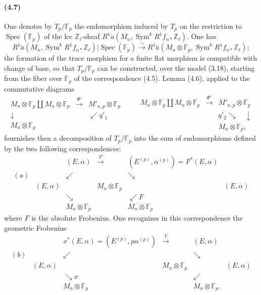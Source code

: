 \documentclass[10pt]{article}
\newcommand{\Z}{\mathbb Z}
\newcommand{\Sym}{\operatorname{Sym}}
\newcommand{\Spec}{\operatorname{Spec}}
\newcommand{\F}{\mathbb F}
\begin{document}
\paragraph{(4.7)}
One denotes by $T_p/\F_p$ the endomorphism induced by $T_p$ on the restriction to $\Spec(\F_p)$ of the lcc $\Z_\ell$-sheaf $R^1\widetilde a(M_n,\Sym^k R^1f_{n*}\Z_\ell)$. One has
\[
R^1\widetilde a(M_n,\Sym^k R^1f_{n*}\Z_\ell)|\Spec(\F_p)
\xrightarrow{\sim}
R^1\widetilde a(M_n\otimes\F_p,\Sym^k R^1f_{n*}\Z_\ell);
\]
the formation of the trace morphism for a finite flat morphism is compatible with change of base, so that $T_p/\F_p$ can be constructed, over the model (3.18), starting from the fiber over $\F_p$ of the correspondence (4.5). Lemma (4.6), applied to the commutative diagrams
\[
\begin{array}{ccc}
M_n\otimes\F_p\coprod M_n\otimes\F_p&\xrightarrow{\Phi'}&M'_{n,p}\otimes\F_p\\
\downarrow&&\swarrow q'_1\\
M_n\otimes\F_p&&
\end{array}
\qquad
\begin{array}{ccc}
M_n\otimes\F_p\coprod M_n\otimes\F_p&\xrightarrow{\Phi'}&M'_{n,p}\otimes\F_p\\
&&q'_2\searrow\quad\downarrow\\
&&M_n\otimes\F_p,
\end{array}
\]
fournishes then a decomposition of $T_p/\F_p$ into the sum of endomorphisms defined by the two following correspondences:
\[
\begin{array}{cccccc}
&& (E,\alpha)&\xrightarrow{F}&(E^{(p)},\alpha^{(p)})=F^*(E,\alpha)\\[-0.2em]
(a)&& \swarrow && \searrow\\[-0.2em]
& (E,\alpha) && M_n\otimes\F_p && (E,\alpha)\\[-0.2em]
&& \searrow && \swarrow F\\[-0.2em]
&& M_n\otimes\F_p && M_n\otimes\F_p
\end{array}
\]
where $F$ is the absolute Frobenius. One recognizes in this correspondence the geometric Frobenius
\[
\begin{array}{cccccc}
&&x^*(E,\alpha)=(E^{(p)},p\alpha^{(p)})&\xrightarrow{\ V\ }&(E,\alpha)\\[-0.2em]
(b)&& \swarrow && \searrow\\[-0.2em]
& (E,\alpha) && M_n\otimes\F_p && (E,\alpha)\\[-0.2em]
&& \searrow x && \swarrow\\[-0.2em]
&& M_n\otimes\F_p && M_n\otimes\F_p.
\end{array}
\]
\end{document}
